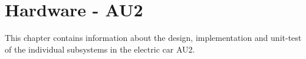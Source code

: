 \chapter{Hardware - AU2}
This chapter contains information about the design, implementation and unit-test of the individual subsystems in the electric car AU2.